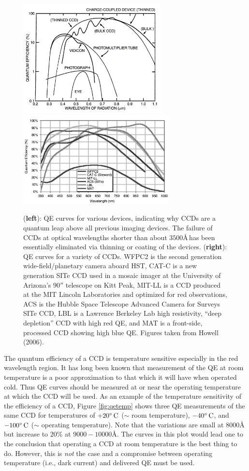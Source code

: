 \documentclass[a4paper,10pt]{article}
\begin{document}
\begin{figure}[t]
    \centering
    \includegraphics[width=7.5cm]{figures/QE.png}
    \includegraphics[width=8cm]{figures/QE_CCDs.png}
    \caption{\footnotesize{(\textbf{left}): QE curves for various devices, indicating why CCDs are a quantum leap above all previous imaging devices. The failure of CCDs at optical wavelengths shorter than about $3500$\AA\,has been essentially eliminated via thinning or coating of the devices. (\textbf{right}): QE curves for a variety of CCDs. WFPC2 is the second generation wide-field/planetary camera aboard HST, CAT-C is a new generation SITe CCD used in a mosaic imager at the University of Arizona's $90''$ telescope on Kitt Peak, MIT-LL is a CCD produced at the MIT Lincoln Laboratories and optimized for red observations, ACS is the Hubble Space Telescope Advanced Camera for Surveys SITe CCD, LBL is a Lawrence Berkeley Lab high resistivity, ``deep depletion'' CCD with high red QE, and MAT is a front-side, processed CCD showing high blue QE. Figures taken from Howell (2006).}}
    \label{fig:qe}
\end{figure}

{\noindent}The quantum efficiency of a CCD is temperature sensitive especially in the red wavelength region. It has long been known that measurement of the QE at room temperature is a poor approximation to that which it will have when operated cold. Thus QE curves should be measured at or near the operating temperature at which the CCD will be used. As an example of the temperature sensitivity of the efficiency of a CCD, Figure \ref{fig:qetemp} shows three QE measurements of the same CCD for temperatures of $+20^\circ\,{\rm C}$ ($\sim$ room temperature), $-40^\circ\,{\rm C}$, and $-100^\circ\,{\rm C}$ ($\sim$ operating temperature). Note that the variations are small at $8000$\AA\,but increase to $20\%$ at $9000-10000$\AA. The curves in this plot would lead one to the conclusion that operating a CCD at room temperature is the best thing to do. However, this is \textit{not} the case and a compromise between operating temperature (i.e., dark current) and delivered QE must be used.
\end{document}
